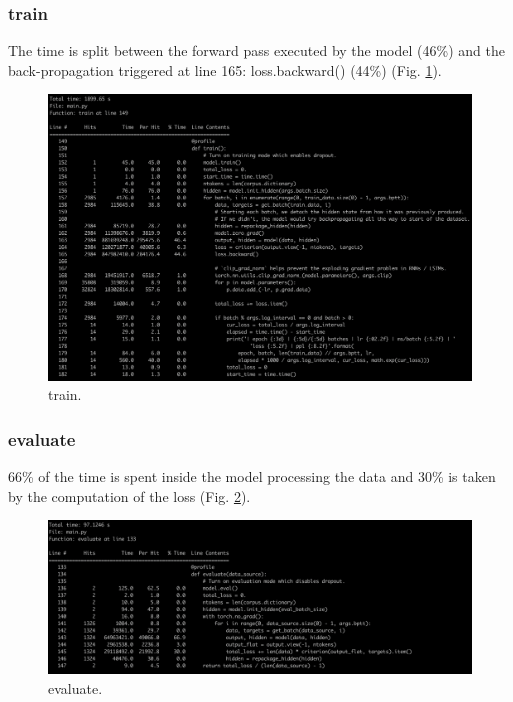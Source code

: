 \documentclass[11pt]{article}
\newcommand{\0}{\mat{0}}
\begin{document}
\begin{itemize}
   \subsubsection*{train}
   The time is split between the forward pass executed by the model (46\%) and the back-propagation triggered at line 165: loss.backward() (44\%) (Fig. \ref{fig:train}).
   \begin{figure}[ht!]
  	\centering
 	 \includegraphics[width=\linewidth]{train.png}
 	 \caption{train.}
 	 \label{fig:train}
   \end{figure}


   \subsubsection*{evaluate}
   66\% of the time is spent inside the model processing the data and 30\% is taken by the computation of the loss (Fig. \ref{fig:evaluate}).
   \begin{figure}[ht!]
  	\centering
 	 \includegraphics[width=\linewidth]{evaluate.png}
 	 \caption{evaluate.}
 	 \label{fig:evaluate}
   \end{figure}


\end{itemize}
\end{document}
